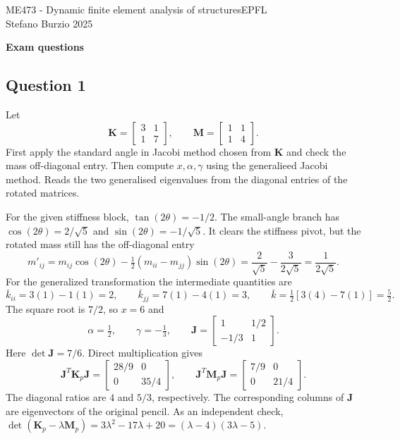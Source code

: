 \documentclass[12pt]{article}
\newcommand{\T}{^{T}}
\newcommand{\vct}[1]{\mathbf{#1}}
\newcommand{\colv}[1]{\begin{bmatrix}#1\end{bmatrix}}
\begin{document}
\noindent ME473 - Dynamic finite element analysis of structures\hfill EPFL\\
Stefano Burzio \hfill 2025\\
\vspace{0.3cm}

\hspace*{\fill}\textbf{\Large Exam questions}\hspace*{\fill}

\hrulefill

\subsection*{Question 1}
Let
        \[
          \vct K=\colv{3&1\\1&7},\qquad \vct M=\colv{1&1\\1&4}.
        \]
        First apply the standard angle in Jacobi method chosen from $\vct K$ and check the mass
        off-diagonal entry. Then compute $x,\alpha,\gamma$ using the generalieed Jacobi method.
     Reads  the two generalised eigenvalues from the diagonal entries of the rotated matrices. 

For the given stiffness block, $\tan(2\theta)=-1/2$.
The small-angle branch has $\cos(2\theta)=2/\sqrt5$ and
$\sin(2\theta)=-1/\sqrt5$. It clears the stiffness pivot, but the rotated
mass still has the off-diagonal entry
\[
   m'_{ij}=m_{ij}\cos(2\theta)-\tfrac12(m_{ii}-m_{jj})\sin(2\theta)
   =\frac{2}{\sqrt5}-\frac{3}{2\sqrt5}=\frac{1}{2\sqrt5}.
\]
For the generalized transformation the intermediate quantities are
\[
   \bar k_{ii}=3(1)-1(1)=2,\qquad
   \bar k_{jj}=7(1)-4(1)=3,\qquad
   \bar k=\tfrac12[3(4)-7(1)]=\tfrac52 .
\]
The square root is $7/2$, so $x=6$ and
\[
   \boxed{\alpha=\tfrac12,\qquad\gamma=-\tfrac13},\qquad
   \vct J=\colv{1&1/2\\-1/3&1}.
\]
Here $\det\vct J=7/6$. Direct multiplication gives
\[
   \vct J\T\vct K_p\vct J=\colv{28/9&0\\0&35/4},\qquad
   \vct J\T\vct M_p\vct J=\colv{7/9&0\\0&21/4}.
\]
The diagonal ratios are $4$ and $5/3$, respectively. The corresponding
columns of $\vct J$ are eigenvectors of the original pencil. As an
independent check, $\det(\vct K_p-\lambda\vct M_p)
   =3\lambda^2-17\lambda+20=(\lambda-4)(3\lambda-5)$.
   
\end{document}
